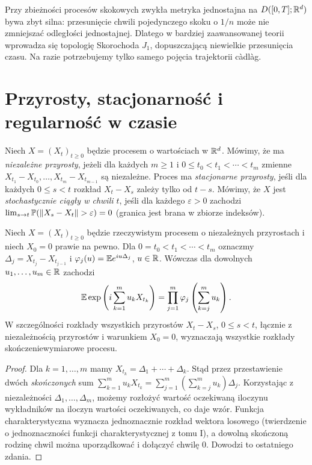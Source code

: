 \begin{uwaga}
Przy zbieżności procesów skokowych zwykła metryka
jednostajna na $D([0,T];\mathbb{R}^d)$ bywa zbyt silna:
przesunięcie chwili pojedynczego skoku o $1/n$
może nie zmniejszać odległości jednostajnej.
Dlatego w bardziej zaawansowanej teorii wprowadza się
topologię Skorochoda $J_1$, dopuszczającą niewielkie
przesunięcia czasu. Na razie potrzebujemy tylko
samego pojęcia trajektorii c\`adl\`ag.
\end{uwaga}

\section{Przyrosty, stacjonarność i regularność w czasie}
\begin{definicja}[Przyrosty]
Niech $X=(X_t)_{t\ge0}$ będzie procesem o wartościach w $\mathbb{R}^d$.
Mówimy, że ma \emph{niezależne przyrosty}, jeżeli dla
każdych $m\ge1$ i $0\le t_0<t_1<\cdots<t_m$
zmienne $X_{t_1}-X_{t_0},\ldots,X_{t_m}-X_{t_{m-1}}$
są niezależne. Proces ma \emph{stacjonarne przyrosty}, jeśli
dla każdych $0\le s<t$ rozkład $X_t-X_s$ zależy tylko od $t-s$.
Mówimy, że $X$ jest \emph{stochastycznie ciągły w chwili $t$},
jeśli dla każdego $\varepsilon>0$ zachodzi
$\lim_{s\to t}\mathbb{P}(\lVert X_s-X_t\rVert>\varepsilon)=0$
(granica jest brana w zbiorze indeksów).
\end{definicja}


\begin{twierdzenie}
Niech $X=(X_t)_{t\ge0}$ będzie rzeczywistym procesem
o niezależnych przyrostach i niech $X_0=0$ prawie na pewno.
Dla $0=t_0<t_1<\cdots<t_m$ oznaczmy
$\Delta_j=X_{t_j}-X_{t_{j-1}}$ i
$\varphi_j(u)=\mathbb{E} e^{iu\Delta_j}$, $u\in\mathbb{R}$.
Wówczas dla dowolnych $u_1,\ldots,u_m\in\mathbb{R}$ zachodzi
\[
\mathbb{E}\exp\left(i\sum_{k=1}^m u_k X_{t_k}\right)
=\prod_{j=1}^m\varphi_j\left(\sum_{k=j}^m u_k\right).
\]
W szczególności rozkłady wszystkich przyrostów
$X_t-X_s$, $0\le s<t$, łącznie z niezależnością
przyrostów i warunkiem $X_0=0$, wyznaczają
wszystkie rozkłady skończeniewymiarowe procesu.
\end{twierdzenie}
\begin{proof}
Dla $k=1,\ldots,m$ mamy
$X_{t_k}=\Delta_1+\cdots+\Delta_k$.
Stąd przez przestawienie dwóch \emph{skończonych} sum
$\sum_{k=1}^m u_k X_{t_k}
=\sum_{j=1}^m(\sum_{k=j}^m u_k)\Delta_j$.
Korzystając z niezależności $\Delta_1,\ldots,\Delta_m$,
możemy rozłożyć wartość oczekiwaną iloczynu
wykładników na iloczyn wartości oczekiwanych,
co daje wzór. Funkcja charakterystyczna wyznacza
jednoznacznie rozkład wektora losowego (twierdzenie
o jednoznaczności funkcji charakterystycznej z tomu I),
a dowolną skończoną rodzinę chwil można uporządkować
i dołączyć chwilę $0$. Dowodzi to ostatniego zdania.
\end{proof}

